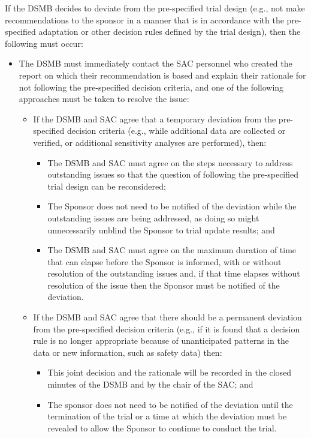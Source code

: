 \documentclass[12pt]{article}
\begin{document}
If the DSMB decides to deviate from the pre-specified trial design (e.g., 
not make recommendations to the sponsor in a manner that is in accordance 
with the pre-specified adaptation or other decision rules defined by the 
trial design), then the following must occur: 
\begin{itemize}
\item The DSMB must immediately contact the SAC personnel who created the report on which their recommendation is based and explain their rationale for not following the pre-specified decision criteria, and one of the following approaches must be taken to resolve the issue:
\begin{itemize}
\item If the DSMB and SAC agree that a temporary deviation from the pre-specified decision criteria (e.g., while additional data are collected or verified, or additional sensitivity analyses are performed), then:
\begin{itemize}
\item The DSMB and SAC must agree on the steps necessary to address outstanding issues so that the question of following the pre-specified trial design can be reconsidered;
\item The Sponsor does not need to be notified of the deviation while the outstanding issues are being addressed, as doing so might unnecessarily unblind the Sponsor to trial update results; and
\item The DSMB and SAC must agree on the maximum duration of time that can elapse before the Sponsor is informed, with or without resolution of the outstanding issues and, if that time elapses without resolution of the issue then the Sponsor must be notified of the deviation.
\end{itemize}

\item If the DSMB and SAC agree that there should be a permanent deviation from the pre-specified decision criteria (e.g., if it is found that a decision rule is no longer appropriate because of unanticipated patterns in the data or new information, such as safety data) then:
\begin{itemize}
\item This joint decision and the rationale will be recorded in the closed minutes of the DSMB and by the chair of the SAC; and
\item The sponsor does not need to be notified of the deviation until the termination of the trial or a time at which the deviation must be revealed to allow the Sponsor to continue to conduct the trial.
\end{itemize}


\end{itemize}
\end{itemize}
\end{document}
